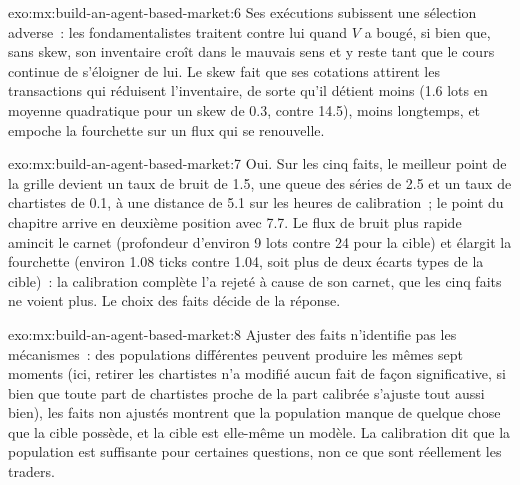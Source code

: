 \begin{solution}{exo:mx:build-an-agent-based-market:6}
Ses exécutions subissent une sélection adverse~: les fondamentalistes traitent contre lui quand $V$ a bougé, si bien que, sans skew, son inventaire croît dans le mauvais sens et
y reste tant que le cours continue de s'éloigner de lui. Le skew fait que ses cotations attirent les transactions qui réduisent l'inventaire, de sorte qu'il détient moins (1.6 lots en moyenne quadratique pour un skew de 0.3, contre 14.5), moins longtemps, et empoche la fourchette sur un flux qui se renouvelle.
\end{solution}

\begin{solution}{exo:mx:build-an-agent-based-market:7}
Oui. Sur les cinq faits, le meilleur point de la grille devient un taux de bruit de 1.5, une queue des séries de 2.5 et un taux de chartistes de 0.1, à une distance de 5.1 sur les
heures de calibration~; le point du chapitre arrive en deuxième position avec 7.7. Le flux de bruit plus rapide amincit le carnet (profondeur d'environ 9 lots contre 24 pour la cible) et élargit
la fourchette (environ 1.08 ticks contre 1.04, soit plus de deux écarts types de la cible)~: la calibration complète l'a rejeté à cause de son carnet, que les cinq
faits ne voient plus. Le choix des faits décide de la réponse.
\end{solution}

\begin{solution}{exo:mx:build-an-agent-based-market:8}
Ajuster des faits n'identifie pas les mécanismes~: des populations différentes peuvent produire les mêmes sept moments (ici, retirer les chartistes n'a modifié aucun fait
de façon significative, si bien que toute part de chartistes proche de la part calibrée s'ajuste tout aussi bien), les faits non ajustés montrent que la population manque de quelque chose que la cible
possède, et la cible est elle-même un modèle. La calibration dit que la population est suffisante pour certaines questions, non ce que sont réellement les traders.
\end{solution}

